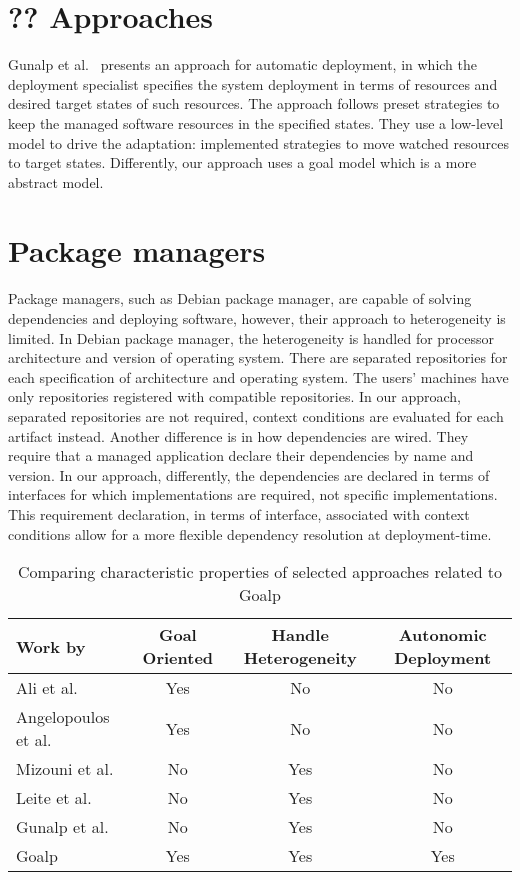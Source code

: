 \section{?? Approaches}

Gunalp et al.~\citep{gunalp_rondo_2015} presents an approach for automatic deployment, in which the deployment specialist specifies the system deployment in terms of resources and desired target states of such resources. The approach follows preset strategies to keep the managed software resources in the specified states. They use a low-level model to drive the adaptation: implemented strategies to move watched resources to target states. Differently, our approach uses a goal model which is a more abstract model.


\section{Package managers}
Package managers, such as Debian package manager\cite{aoki_debian_2016}, are capable of solving dependencies and deploying software, however, their approach to heterogeneity is limited. In Debian package manager, the heterogeneity is handled for processor architecture and version of operating system. There are separated repositories for each specification of architecture and operating system. The users' machines have only repositories registered with compatible repositories.
In our approach, separated repositories are not required, context conditions are evaluated for each artifact instead.
Another difference is in how dependencies are wired. They require that a managed application declare their dependencies by name and version. In our approach, differently, the dependencies are declared in terms of interfaces for which implementations are required, not specific implementations.
This requirement declaration, in terms of interface, associated with context conditions allow for a more flexible dependency resolution at deployment-time.

\begin{table*}[!ht]
\centering
\caption{Comparing characteristic properties of selected approaches related to Goalp}
\label{table_related_works}
\begin{tabular}{p{4cm} ccc}
\toprule
Work by &
   Goal Oriented &
    Handle Heterogeneity &
    Autonomic Deployment \\
\midrule
Ali et al.\citep{ali_requirements-driven_2014} & \cellcolor{blue!10} Yes & No & No \\
Angelopoulos et al. \cite{angelopoulos_capturing_2015} & \cellcolor{blue!10}Yes & No & No \\
Mizouni et al. \citep{mizouni_framework_2014} & No & \cellcolor{blue!10} Yes & No \\
Leite et al. \citep{ferreira_leite_user_2014}  & No & \cellcolor{blue!10} Yes & No \\
Gunalp et al.\citep{gunalp_rondo_2015} & No & \cellcolor{blue!10} Yes  &  No\\
Goalp & \cellcolor{blue!10} Yes & \cellcolor{blue!10} Yes & \cellcolor{blue!10} Yes \\
\bottomrule
\end{tabular}
\end{table*}

